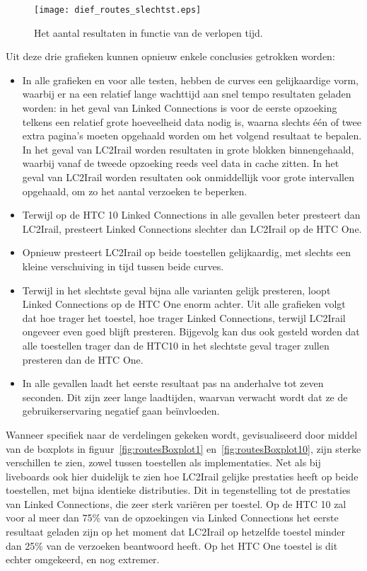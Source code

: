 \begin{figure}[h]
	\centering
	\texttt{[image: dief\_routes\_slechtst.eps]}
	\caption[Aantal resultaten routes in functie van de tijd (90e percentiel)]{Het aantal resultaten in functie van de verlopen tijd.}
	\label{fig:routesDiefSlechtst}
\end{figure}

Uit deze drie grafieken kunnen opnieuw enkele conclusies getrokken worden:
\begin{itemize}
	\item In alle grafieken en voor alle testen, hebben de curves een gelijkaardige vorm, waarbij er na een relatief lange wachttijd aan snel tempo resultaten geladen worden: in het geval van Linked Connections is voor de eerste opzoeking telkens een relatief grote hoeveelheid data nodig is, waarna slechts één of twee extra pagina's moeten opgehaald worden om het volgend resultaat te bepalen. In het geval van LC2Irail worden resultaten in grote blokken binnengehaald, waarbij vanaf de tweede opzoeking reeds veel data in cache zitten. In het geval van LC2Irail worden resultaten ook onmiddellijk voor grote intervallen opgehaald, om zo het aantal verzoeken te beperken. 
	\item Terwijl op de HTC 10 Linked Connections in alle gevallen beter presteert dan LC2Irail, presteert Linked Connections slechter dan LC2Irail op de HTC One. 
	\item Opnieuw presteert LC2Irail op beide toestellen gelijkaardig, met slechts een kleine verschuiving in tijd tussen beide curves.
	\item Terwijl in het slechtste geval bijna alle varianten gelijk presteren, loopt Linked Connections op de HTC One enorm achter. Uit alle grafieken volgt dat hoe trager het toestel, hoe trager Linked Connections, terwijl LC2Irail ongeveer even goed blijft presteren. Bijgevolg kan dus ook gesteld worden dat alle toestellen trager dan de HTC10 in het slechtste geval trager zullen presteren dan de HTC One.
	\item In alle gevallen laadt het eerste resultaat pas na anderhalve tot zeven seconden. Dit zijn zeer lange laadtijden, waarvan verwacht wordt dat ze de gebruikerservaring negatief gaan beïnvloeden.
\end{itemize}

Wanneer specifiek naar de verdelingen gekeken wordt, gevisualiseerd door middel van de boxplots in figuur~\ref{fig:routesBoxplot1} en~\ref{fig:routesBoxplot10}, zijn sterke verschillen te zien, zowel tussen toestellen als implementaties. Net als bij liveboards ook hier duidelijk te zien hoe LC2Irail gelijke prestaties heeft op beide toestellen, met bijna identieke distributies. Dit in tegenstelling tot de prestaties van Linked Connections, die zeer sterk variëren per toestel. Op de HTC 10 zal voor al meer dan 75\% van de opzoekingen via Linked Connections het eerste resultaat geladen zijn op het moment dat LC2Irail op hetzelfde toestel minder dan 25\% van de verzoeken beantwoord heeft. Op het HTC One toestel is dit echter omgekeerd, en nog extremer. 

